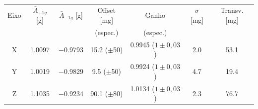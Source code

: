 \begin{tabular}{ccccccc}
\toprule
Eixo & $\bar{A}_{+1g}$ [g] & $\bar{A}_{-1g}$ [g] & Offset [mg] & Ganho & $\sigma$ [mg] & Transv. [mg] \\
 & & & (espec.) & (espec.) & & \\
\midrule
X & \num{+1.0097} & \num{-0.9793} & \num{+15.2} ($\pm$50) & \num{0.9945} ($1\pm0{,}03$) & \num{2.0} & \num{53.1} \\
Y & \num{+1.0019} & \num{-0.9829} & \num{+9.5} ($\pm$50) & \num{0.9924} ($1\pm0{,}03$) & \num{4.7} & \num{19.4} \\
Z & \num{+1.1035} & \num{-0.9234} & \num{+90.1} ($\pm$80) & \num{1.0134} ($1\pm0{,}03$) & \num{2.3} & \num{76.7} \\
\bottomrule
\end{tabular}
